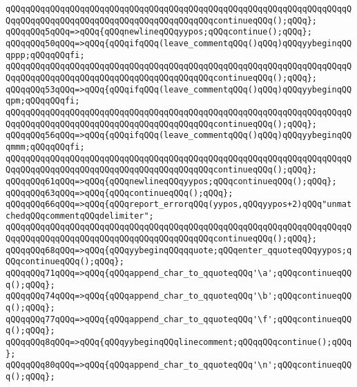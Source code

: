 \verb|qQQqqQQqqQQqqQQqqQQqqQQqqQQqqQQqqQQqqQQqqQQqqQQqqQQqqQQqqQQqqQQqqQQqqQQqqQQqqQQqqQQqqQQqqQQqqQQqqQQqqQQqqQQqqQQqcontinueqQQq();qQQq};|\newline
\verb|qQQqqQQq5qQQq=>qQQq{qQQqnewlineqQQqyypos;qQQqcontinue();qQQq};|\newline
\verb|qQQqqQQq50qQQq=>qQQq{qQQqifqQQq(leave_commentqQQq()qQQq)qQQqyybeginqQQqppp;qQQqqQQqfi;|\newline
\verb|qQQqqQQqqQQqqQQqqQQqqQQqqQQqqQQqqQQqqQQqqQQqqQQqqQQqqQQqqQQqqQQqqQQqqQQqqQQqqQQqqQQqqQQqqQQqqQQqqQQqqQQqqQQqqQQqcontinueqQQq();qQQq};|\newline
\verb|qQQqqQQq53qQQq=>qQQq{qQQqifqQQq(leave_commentqQQq()qQQq)qQQqyybeginqQQqpm;qQQqqQQqfi;|\newline
\verb|qQQqqQQqqQQqqQQqqQQqqQQqqQQqqQQqqQQqqQQqqQQqqQQqqQQqqQQqqQQqqQQqqQQqqQQqqQQqqQQqqQQqqQQqqQQqqQQqqQQqqQQqqQQqqQQqcontinueqQQq();qQQq};|\newline
\verb|qQQqqQQq56qQQq=>qQQq{qQQqifqQQq(leave_commentqQQq()qQQq)qQQqyybeginqQQqmmm;qQQqqQQqfi;|\newline
\verb|qQQqqQQqqQQqqQQqqQQqqQQqqQQqqQQqqQQqqQQqqQQqqQQqqQQqqQQqqQQqqQQqqQQqqQQqqQQqqQQqqQQqqQQqqQQqqQQqqQQqqQQqqQQqqQQqcontinueqQQq();qQQq};|\newline
\verb|qQQqqQQq61qQQq=>qQQq{qQQqnewlineqQQqyypos;qQQqcontinueqQQq();qQQq};|\newline
\verb|qQQqqQQq63qQQq=>qQQq{qQQqcontinueqQQq();qQQq};|\newline
\verb|qQQqqQQq66qQQq=>qQQq{qQQqreport_errorqQQq(yypos,qQQqyypos+2)qQQq"unmatchedqQQqcommentqQQqdelimiter";|\newline
\verb|qQQqqQQqqQQqqQQqqQQqqQQqqQQqqQQqqQQqqQQqqQQqqQQqqQQqqQQqqQQqqQQqqQQqqQQqqQQqqQQqqQQqqQQqqQQqqQQqqQQqqQQqqQQqqQQqcontinueqQQq();qQQq};|\newline
\verb|qQQqqQQq68qQQq=>qQQq{qQQqyybeginqQQqqquote;qQQqenter_qquoteqQQqyypos;qQQqcontinueqQQq();qQQq};|\newline
\verb|qQQqqQQq71qQQq=>qQQq{qQQqappend_char_to_qquoteqQQq'\a';qQQqcontinueqQQq();qQQq};|\newline
\verb|qQQqqQQq74qQQq=>qQQq{qQQqappend_char_to_qquoteqQQq'\b';qQQqcontinueqQQq();qQQq};|\newline
\verb|qQQqqQQq77qQQq=>qQQq{qQQqappend_char_to_qquoteqQQq'\f';qQQqcontinueqQQq();qQQq};|\newline
\verb|qQQqqQQq8qQQq=>qQQq{qQQqyybeginqQQqlinecomment;qQQqqQQqcontinue();qQQq};|\newline
\verb|qQQqqQQq80qQQq=>qQQq{qQQqappend_char_to_qquoteqQQq'\n';qQQqcontinueqQQq();qQQq};|\newline
